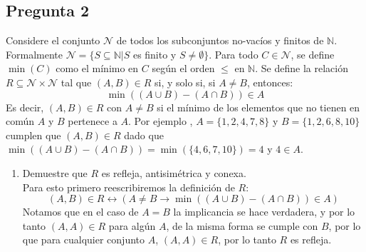 \documentclass[letter]{article}
\begin{document}
	\begin{pregunta}{2}
		\section*{Pregunta 2}
		Considere el conjunto $\mathcal{N}$ de todos los subconjuntos no-vacíos y finitos de $\mathbb{N}$. Formalmente $\mathcal{N} = \{S \subseteq \mathbb{N}| S$ es finito y $S\neq \emptyset\}$. Para todo $C\in \mathcal{N}$, se define $\min(C)$ como el mínimo en $C$ según el orden $\leq$ en $\mathbb{N}$. Se define la relación $R \subseteq \mathcal{N}\times \mathcal{N}$ tal que $(A,B)\in R$ si, y solo si, si $A\neq B$, entonces:
		$$\min\left((A\cup B)-(A \cap B)\right) \in A$$
		Es decir, $(A,B) \in R$ con $A\neq B$ si el mínimo de los elementos que no tienen en común $A$ y $B$ pertenece a $A$. Por ejemplo , $A = \{1,2,4,7,8\} $ y $B = \{1,2,6,8,10\}$ cumplen que $(A,B) \in R$ dado que $\min\left((A\cup B) - (A\cap B)\right) = \min\left(\{4,6,7,10\}\right) = 4$ y $4\in A$.
		\begin{enumerate}
		\item Demuestre que $R$ es refleja, antisimétrica y conexa.\\
		
		Para esto primero reescribiremos la definición de $R$:
		$$(A,B)\in R \leftrightarrow \left(A\neq B \rightarrow \min\left((A\cup B)-(A \cap B)\right) \in A\right)$$ 
		Notamos que en el caso de $A=B$ la implicancia se hace verdadera, y por lo tanto $(A,A)\in R$ para algún $A$, de la misma forma se cumple con $B$, por lo que para cualquier conjunto $A$, $(A,A)\in R$, por lo tanto $R$ es refleja.\\
		

\end{enumerate}
\end{pregunta}
\end{document}
